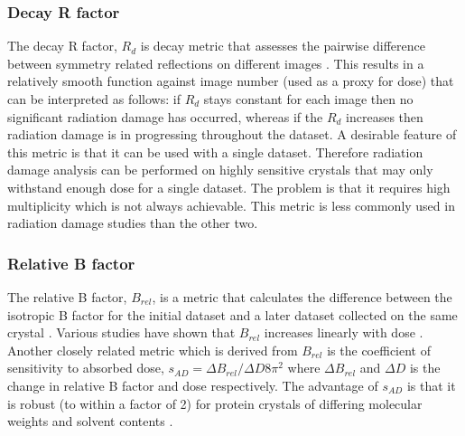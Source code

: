         \subsubsection{Decay R factor}
        \label{subs:Decay R factor}
            The decay R factor, $R_d$ is decay metric that assesses the pairwise difference between symmetry related reflections on different images \cite{diederichs2006}.
            This results in a relatively smooth function against image number (used as a proxy for dose) that can be interpreted as follows: if $R_d$ stays constant for each image then no significant radiation damage has occurred, whereas if the $R_d$ increases then radiation damage is in progressing throughout the dataset.
            A desirable feature of this metric is that it can be used with a single dataset.
            Therefore radiation damage analysis can be performed on highly sensitive crystals that may only withstand enough dose for a single dataset.
			The problem is that it requires high multiplicity which is not always achievable. This metric is less commonly used in radiation damage studies than the other two.

        \subsubsection{Relative B factor}
        \label{subs:Relative B factor}
            The relative B factor, $B_{rel}$, is a metric that calculates the difference between the isotropic B factor for the initial dataset and a later dataset collected on the same crystal \cite{kmetko2006}.
            Various studies have shown that $B_{rel}$ increases linearly with dose \cite{kmetko2006,borek2007many,bourenkov2010optimization,leal2012}.
            Another closely related metric which is derived from $B_{rel}$ is the coefficient of sensitivity to absorbed dose, $s_{AD} = \Delta B_{rel} / \Delta D 8\pi^2$ where $\Delta B_{rel}$ and $\Delta D$ is the change in relative B factor and dose respectively. The advantage of $s_{AD}$ is that it is robust (to within a factor of 2) for protein crystals of differing molecular weights and solvent contents \cite{kmetko2006}.

